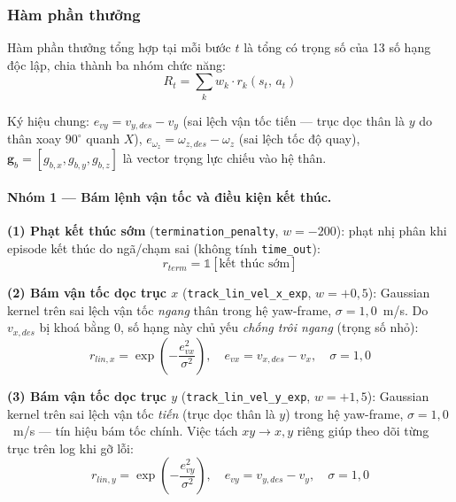 \subsubsection{Hàm phần thưởng}
\label{sec:reward_fn}

Hàm phần thưởng tổng hợp tại mỗi bước $t$ là tổng có trọng số của 13 số hạng
độc lập, chia thành ba nhóm chức năng:
\begin{equation}
    R_t = \sum_{k} w_k \cdot r_k(s_t,\,a_t)
    \label{eq:total_reward}
\end{equation}

Ký hiệu chung: $e_{vy}=v_{y,des}-v_{y}$ (sai lệch vận tốc tiến --- trục dọc
thân là $y$ do thân xoay $90^\circ$ quanh $X$), $e_{\omega_z}=\omega_{z,des}-\omega_{z}$
(sai lệch tốc độ quay), $\mathbf{g}_b=[g_{b,x},g_{b,y},g_{b,z}]$ là vector
trọng lực chiếu vào hệ thân.

\paragraph{Nhóm 1 --- Bám lệnh vận tốc và điều kiện kết thúc.}

\textbf{(1) Phạt kết thúc sớm} (\texttt{termination\_penalty}, $w=-200$):
phạt nhị phân khi episode kết thúc do ngã/chạm sai (không tính \texttt{time\_out}):
\begin{equation}
    r_{term} = \mathbb{1}[\text{kết thúc sớm}]
    \label{eq:rew_term}
\end{equation}

\textbf{(2) Bám vận tốc dọc trục $x$} (\texttt{track\_lin\_vel\_x\_exp},
$w=+0{,}5$): Gaussian kernel trên sai lệch vận tốc \emph{ngang} thân trong hệ
yaw-frame, $\sigma=1{,}0$~m/s. Do $v_{x,des}$ bị khoá bằng 0, số hạng này
chủ yếu \emph{chống trôi ngang} (trọng số nhỏ):
\begin{equation}
    r_{lin,x} = \exp\!\left(-\frac{e_{vx}^2}{\sigma^2}\right),
    \quad e_{vx}=v_{x,des}-v_x,\quad \sigma=1{,}0
    \label{eq:rew_lin_x}
\end{equation}

\textbf{(3) Bám vận tốc dọc trục $y$} (\texttt{track\_lin\_vel\_y\_exp},
$w=+1{,}5$): Gaussian kernel trên sai lệch vận tốc \emph{tiến} (trục dọc thân
là $y$) trong hệ yaw-frame, $\sigma=1{,}0$~m/s — tín hiệu bám tốc chính. Việc
tách $xy\to x,y$ riêng giúp theo dõi từng trục trên log khi gỡ lỗi:
\begin{equation}
    r_{lin,y} = \exp\!\left(-\frac{e_{vy}^2}{\sigma^2}\right),
    \quad e_{vy}=v_{y,des}-v_y,\quad \sigma=1{,}0
    \label{eq:rew_lin_y}
\end{equation}

